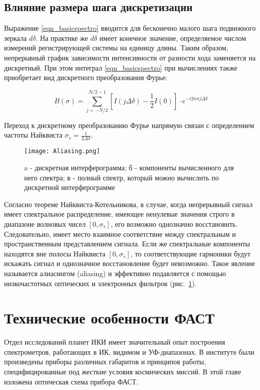 \documentclass{mipt-thesis-bs}
\begin{document}
\section{Влияние размера шага дискретизации}
Выражение \eqref{eqn_basicspectro} вводится для бесконечно малого шага подвижного зеркала $d\delta$. На практике же $d\delta$ имеет конечное значение, определяемое числом измерений регистрирующей системы на единицу длины. Таким образом, непрерывный график зависимости интенсивности от разности хода заменяется на дискретный. При этом интеграл \eqref{eqn_basicspectro} при вычислениях также приобретает вид дискретного преобразования Фурье:

\begin{equation}
	B(\sigma)=\sum_{j=-N/2}^{N/2-1} \left[I(j\Delta \delta )-\frac{1}{2}I(0)\right] \cdot e^{-i2\pi \sigma j \Delta \delta}
\end{equation}

Переход к дискретному преобразованию Фурье напрямую связан с определением частоты Найквиста  $\sigma_s=\frac{1}{2\Delta \delta}$.
\begin{figure}[h!]
	\centering
	\texttt{[image: Aliasing.png]}
	\caption{a  - дискретная интерферограмма; б - компоненты вычисленного для него спектра; в - полный спектр, который можно вычислить по дискретной интерферограмме}
	\label{fig_aliasing}
\end{figure}

 Согласно теореме Найквиста-Котельникова, в случае, когда непрерывный сигнал имеет спектральное распределение, имеющее ненулевые значения строго в диапазоне волновых чисел $[0,\sigma_s]$, его возможно однозначно восстановить. Следовательно, имеет место взаимное соответствие между спектральным и пространственным представлением сигнала. Если же спектральные компоненты находятся вне полосы Найквиста $[0,\sigma_s]$, то соответствующие гармоники будут искажать сигнал и однозначное восстановление будет невозможно. Такое явление называется алиасингом (aliasing) и эффективно подавляется с помощью низкочастотных оптических и электронных фильтров (рис.~\ref{fig_aliasing}).

\chapter{Технические особенности ФАСТ}
Отдел исследований планет ИКИ имеет значительный опыт построения спектрометров, работающих в ИК, видимом и УФ-диапазонах. В институте были произведены приборы различных габаритов и принципов работы, специфицированные под жесткие условия космических миссий. В этой главе изложена оптическая схема прибора ФАСТ.
\end{document}
